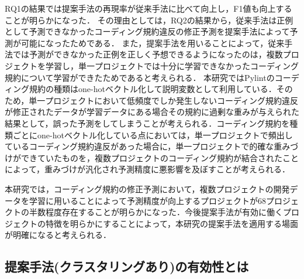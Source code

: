 \documentclass[submit,noauthor,dvipdfmx]{ipsj}
\begin{document}
RQ1の結果では提案手法の再現率が従来手法に比べて向上し，F1値も向上することが明らかになった．
その理由としては，RQ2の結果から，従来手法は正例として予測できなかったコーディング規約違反の修正予測を提案手法によって予測が可能になったためである．
また，提案手法を用いることによって，従来手法では予測ができなかった正例を正しく予想できるようになったのは，複数プロジェクトを学習し，単一プロジェクトでは十分に学習できなかったコーディング規約について学習ができたためであると考えられる．
本研究ではPylintのコーディング規約の種類はone-hotベクトル化して説明変数として利用している．そのため，単一プロジェクトにおいて低頻度でしか発生しないコーディング規約違反が修正されたデータが学習データにある場合その規約に過剰な重みが与えられた結果として，誤った予測をしてしまうことが考えられる．コーディング規約を種類ごとにone-hotベクトル化している点においては，単一プロジェクトで頻出しているコーディング規約違反があった場合に，単一プロジェクトで的確な重みづけができていたものを，複数プロジェクトのコーディング規約が結合されたことによって，重みづけが汎化され予測精度に悪影響を及ぼすことが考えられる．

本研究では，コーディング規約の修正予測において，複数プロジェクトの開発データを学習に用いることによって予測精度が向上するプロジェクトが68プロジェクトの半数程度存在することが明らかになった．今後提案手法が有効に働くプロジェクトの特徴を明らかにすることによって，本研究の提案手法を適用する場面が明確になると考えられる．

\subsection{提案手法(クラスタリングあり)の有効性とは}

\begin{table}[th]
    \centering
    \caption{クラスタごとの予測結果の分析}
    \label{tab:cluster}
    \vspace{3mm}
\end{table}
\end{document}
